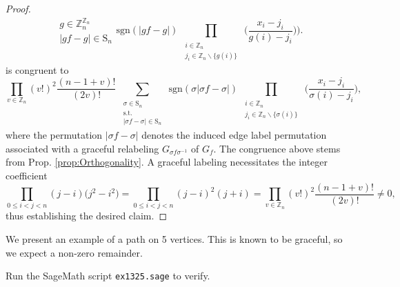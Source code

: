 \begin{proof}
\[{\begin{array}{c}
g\in\mathbb{Z}_{n}^{\mathbb{Z}_{n}}\\
|gf-g|\in\text{S}_{n}
\end{array}}\text{sgn}(|gf-g|)\prod_{\begin{array}{c}
\substack{i\in\mathbb{Z}_{n}\\
j_{i}\in\mathbb{Z}_{n}\backslash\{g(i)\}
}
\end{array}}\big(\frac{x_{i}-j_{i}}{g(i)-j_{i}}\big)\bigg).
\]
is congruent to
\begin{equation} \label{eq:graceful-evaluation}
\prod_{v\in\mathbb{Z}_{n}}(v!)^{2}\frac{(n-1+v)!}{(2v)!}\sum_{\begin{array}{c}
\substack{\sigma\in\text{S}_{n}\\
\text{s.t.}\\
\left|\sigma f-\sigma\right|\in\text{S}_{n}
}
\end{array}}\text{sgn}(\sigma\left|\sigma f-\sigma\right|)\prod_{\begin{array}{c}
\substack{i\in\mathbb{Z}_{n}\\
j_{i}\in\mathbb{Z}_{n}\backslash\{\sigma(i)\}
}
\end{array}}\big(\frac{x_{i}-j_{i}}{\sigma(i)-j_{i}}\big),
\end{equation}
where the permutation $|\sigma f-\sigma |$ denotes the induced edge label permutation associated with a graceful relabeling $G_{\sigma f\sigma^{-1}}$ of $G_f$.
The congruence above stems from Prop. \ref{prop:Orthogonality}. A graceful labeling necessitates the integer coefficient
\[
\prod_{0\le i<j<n}(j-i)\big(j^{2}-i^{2})=\prod_{0\le i<j<n}(j-i)^{2}(j+i)=\prod_{v\in\mathbb{Z}_{n}}\left(v!\right)^{2}\frac{\left(n-1+v\right)!}{\left(2v\right)!} \neq 0,
\]
thus establishing the desired claim.
\end{proof}
\begin{example} We present an example of a path on 5 vertices. This is known to be graceful, so we expect a non-zero remainder.
\ \\
\begin{center}   
\end{center}
Run the SageMath script \texttt{ex1325.sage} to verify.
\end{example}
